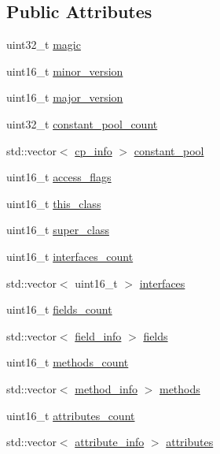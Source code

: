 \subsection*{Public Attributes}
\begin{DoxyCompactItemize}
\item 
uint32\+\_\+t \hyperlink{classClassFile_a9d4d72751ff9250dd3305d5d853f7921}{magic}
\item 
uint16\+\_\+t \hyperlink{classClassFile_a357116b538d1b1ef11073560eba9396d}{minor\+\_\+version}
\item 
uint16\+\_\+t \hyperlink{classClassFile_a931ebda6a22c18e009891d40016b2790}{major\+\_\+version}
\item 
uint32\+\_\+t \hyperlink{classClassFile_a76abb829a9ebb954e9ef381f144bdbf9}{constant\+\_\+pool\+\_\+count}
\item 
std\+::vector$<$ \hyperlink{structs_8hpp_a0c0d87e91cda2669bf03488501eccd4d}{cp\+\_\+info} $>$ \hyperlink{classClassFile_aecb7bcd6074a0dbda85dea876a691187}{constant\+\_\+pool}
\item 
uint16\+\_\+t \hyperlink{classClassFile_a2d095ef980330834af44c587ce52590e}{access\+\_\+flags}
\item 
uint16\+\_\+t \hyperlink{classClassFile_aa45abc9545fe11fca252d9769b665294}{this\+\_\+class}
\item 
uint16\+\_\+t \hyperlink{classClassFile_aa48f683b6e5b60021410f88a5e831cbe}{super\+\_\+class}
\item 
uint16\+\_\+t \hyperlink{classClassFile_a25f384f7a9746352aad90fb499126704}{interfaces\+\_\+count}
\item 
std\+::vector$<$ uint16\+\_\+t $>$ \hyperlink{classClassFile_a5ff706f77d13aa4cd2876e6a083ed849}{interfaces}
\item 
uint16\+\_\+t \hyperlink{classClassFile_a517d14b0d9e507f1485a3b6d3cb38683}{fields\+\_\+count}
\item 
std\+::vector$<$ \hyperlink{structs_8hpp_a9dec70227361c4b10468fe98e7b8d2ab}{field\+\_\+info} $>$ \hyperlink{classClassFile_adf8e8ff620c2e938c5bcb8616e754ce3}{fields}
\item 
uint16\+\_\+t \hyperlink{classClassFile_a479310e3e0674d9171d24beb794fcb14}{methods\+\_\+count}
\item 
std\+::vector$<$ \hyperlink{structs_8hpp_a6cbc7230791f4ca5e82816e58baeeacc}{method\+\_\+info} $>$ \hyperlink{classClassFile_ab1f087a706ccd7f5334bd17ed4d05936}{methods}
\item 
uint16\+\_\+t \hyperlink{classClassFile_accd99ee441c45eb8fdcd3836d56e9ef4}{attributes\+\_\+count}
\item 
std\+::vector$<$ \hyperlink{attributes_8hpp_a7af51299ff517acce960ac87c9db9899}{attribute\+\_\+info} $>$ \hyperlink{classClassFile_a119011b9d84894da116c83fa6539d5ce}{attributes}
\end{DoxyCompactItemize}


